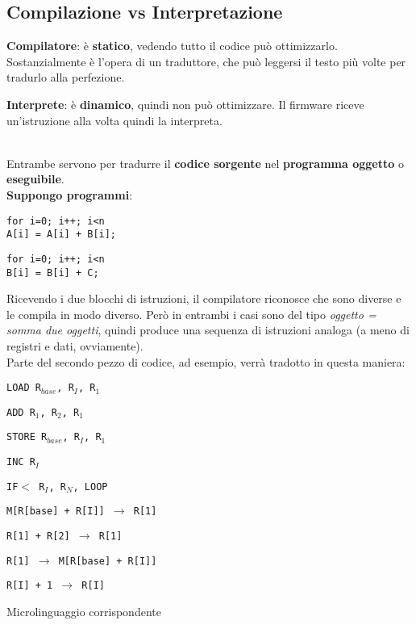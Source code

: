 \documentclass[10pt]{report}
\begin{document}
\subsection{Compilazione vs Interpretazione}
\begin{multicols}{2}
\textbf{Compilatore}: è \textbf{statico}, vedendo tutto il codice può ottimizzarlo. Sostanzialmente è l'opera di un traduttore, che può leggersi il testo più volte per tradurlo alla perfezione.\\
\columnbreak

\textbf{Interprete}: è \textbf{dinamico}, quindi non può ottimizzare. Il firmware riceve un'istruzione alla volta quindi la interpreta.\\\\
\end{multicols}
Entrambe servono per tradurre il \textbf{codice sorgente} nel \textbf{programma oggetto} o \textbf{eseguibile}.\\

\textbf{Suppongo programmi}:\\
\begin{multicols}{2}
\texttt{for i=0; i++; i<n\\    A[i] = A[i] + B[i];}

\columnbreak
\texttt{for i=0; i++; i<n\\    B[i] = B[i] + C;}
\end{multicols}
Ricevendo i due blocchi di istruzioni, il compilatore riconosce che sono diverse e le compila in modo diverso. Però in entrambi i casi sono del tipo \textit{oggetto = somma due oggetti}, quindi produce una sequenza di istruzioni analoga (a meno di registri e dati, ovviamente).\\

\pagebreak
Parte del secondo pezzo di codice, ad esempio, verrà tradotto in questa maniera:
\begin{multicols}{2}
\begin{list}{}{}
\item \texttt{LOAD R$_{base}$, R$_{I}$, R$_{1}$}
\item \texttt{ADD R$_{1}$, R$_{2}$, R$_{1}$}
\item \texttt{STORE R$_{base}$, R$_{I}$, R$_{1}$}
\item \texttt{INC R$_{I}$}
\item \texttt{IF$<$ R$_{I}$, R$_{N}$, LOOP}
\end{list}
\columnbreak
\begin{list}{}{}
\item \texttt{M[R[base] + R[I]] $\rightarrow$ R[1]}
\item \texttt{R[1] + R[2] $\rightarrow$ R[1]}
\item \texttt{R[1]  $\rightarrow$ M[R[base] + R[I]]}
\item \texttt{R[I] + 1 $\rightarrow$ R[I]}
\end{list}
Microlinguaggio corrispondente
\end{multicols}
\end{document}
